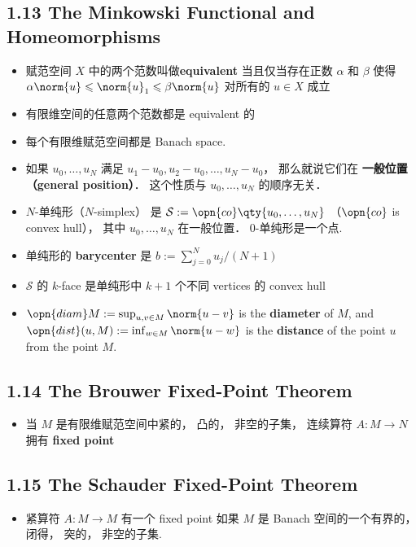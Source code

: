 \subsection{1.13 The Minkowski Functional and Homeomorphisms}
\begin{itemize}
\item 赋范空间 $X$ 中的两个范数叫做\textbf{equivalent} 当且仅当存在正数 $\alpha$ 和 $\beta$ 使得 $\alpha \norm{u} \leqslant \norm{u}_1 \leqslant \beta \norm{u}$ 对所有的 $u \in X$ 成立

\item 有限维空间的任意两个范数都是 equivalent 的

\item 每个有限维赋范空间都是 Banach space.

\item 如果 $u_0, \dots, u_N$  满足 $u_1 - u_0, u_2 - u_0,\dots, u_N - u_0$， 那么就说它们在 \textbf{一般位置（general position）}． 这个性质与 $u_0, \dots, u_N$ 的顺序无关．

\item $N$-单纯形（$N$-simplex） 是 $\mathcal S := \opn{co}\qty{u_0, \dots, u_N}$ （$\opn{co}$ is convex hull）， 其中 $u_0, \dots, u_N$ 在一般位置． $0$-单纯形是一个点.

\item 单纯形的 \textbf{barycenter} 是 $b := \sum_{j=0}^N u_j / (N+1)$

\item $\mathcal S$ 的 $k$-face 是单纯形中 $k+1$ 个不同 vertices 的 convex hull

\item $\opn{diam} M := \sup_{u, v\in M} \norm{u - v}$ is the \textbf{diameter} of $M$, and $\opn{dist}(u, M) := \inf_{w \in M} \norm{u - w}$ is the \textbf{distance} of the point $u$ from the point $M$.
\end{itemize}

\subsection{1.14 The Brouwer Fixed-Point Theorem}

\begin{itemize}
\item 当 $M$ 是有限维赋范空间中紧的， 凸的， 非空的子集， 连续算符 $A: M \to N$ 拥有 \textbf{fixed point}
\end{itemize}

\subsection{1.15 The Schauder Fixed-Point Theorem}
\begin{itemize}
\item 紧算符 $A: M \to M$ 有一个 fixed point 如果 $M$ 是 Banach 空间的一个有界的， 闭得， 突的， 非空的子集.
\end{itemize}

